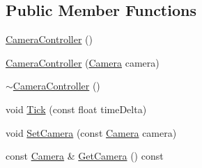 \subsection*{Public Member Functions}
\begin{DoxyCompactItemize}
\item 
\mbox{\hyperlink{classngl_1_1_camera_controller_ad14cf69d4f7bd72450d1ebc2066852b5}{Camera\+Controller}} ()
\item 
\mbox{\hyperlink{classngl_1_1_camera_controller_ad9ac99061f259d9a242fe950472976ad}{Camera\+Controller}} (\mbox{\hyperlink{classngl_1_1_camera}{Camera}} camera)
\item 
\mbox{\hyperlink{classngl_1_1_camera_controller_a3485a214197c5bdbc6fb680b8f4a34ce}{$\sim$\+Camera\+Controller}} ()
\item 
void \mbox{\hyperlink{classngl_1_1_camera_controller_a9f03cb3867665cd2dd5a6b2840acc09d}{Tick}} (const float time\+Delta)
\item 
void \mbox{\hyperlink{classngl_1_1_camera_controller_a0f8ab271aa07607d0a4f8930d38bf97f}{Set\+Camera}} (const \mbox{\hyperlink{classngl_1_1_camera}{Camera}} camera)
\item 
const \mbox{\hyperlink{classngl_1_1_camera}{Camera}} \& \mbox{\hyperlink{classngl_1_1_camera_controller_a6a9fd66ec1ea0a15d463b6c40e77754a}{Get\+Camera}} () const
\end{DoxyCompactItemize}
